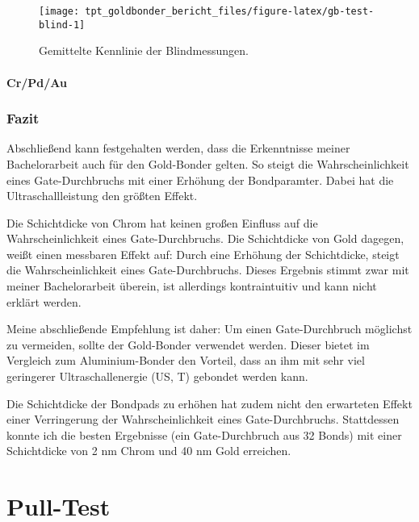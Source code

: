 \documentclass[
  paper=a4,
  ,captions=tableheading
]{scrartcl}
\begin{document}
\begin{figure}

{\centering \texttt{[image: tpt\_goldbonder\_bericht\_files/figure-latex/gb-test-blind-1]} 

}

\caption{Gemittelte Kennlinie der Blindmessungen.}\label{fig:gb-test-blind}
\end{figure}

\hypertarget{crpdau}{%
\subsection{Cr/Pd/Au}\label{crpdau}}

\hypertarget{conclusion}{%
\section{Fazit}\label{conclusion}}

Abschließend kann festgehalten werden, dass die Erkenntnisse meiner Bachelorarbeit auch für den Gold-Bonder gelten. So steigt die Wahrscheinlichkeit eines Gate-Durchbruchs mit einer Erhöhung der Bondparamter. Dabei hat die Ultraschallleistung den größten Effekt.

Die Schichtdicke von Chrom hat keinen großen Einfluss auf die Wahrscheinlichkeit eines Gate-Durchbruchs. Die Schichtdicke von Gold dagegen, weißt einen messbaren Effekt auf: Durch eine Erhöhung der Schichtdicke, steigt die Wahrscheinlichkeit eines Gate-Durchbruchs. Dieses Ergebnis stimmt zwar mit meiner Bachelorarbeit überein, ist allerdings kontraintuitiv und kann nicht erklärt werden.

Meine abschließende Empfehlung ist daher: Um einen Gate-Durchbruch möglichst zu vermeiden, sollte der Gold-Bonder verwendet werden. Dieser bietet im Vergleich zum Aluminium-Bonder den Vorteil, dass an ihm mit sehr viel geringerer Ultraschallenergie (US, T) gebondet werden kann.

Die Schichtdicke der Bondpads zu erhöhen hat zudem nicht den erwarteten Effekt einer Verringerung der Wahrscheinlichkeit eines Gate-Durchbruchs. Stattdessen konnte ich die besten Ergebnisse (ein Gate-Durchbruch aus 32 Bonds) mit einer Schichtdicke von 2 nm Chrom und 40 nm Gold erreichen.

\hypertarget{pt}{%
\part{Pull-Test}\label{pt}}
\end{document}
